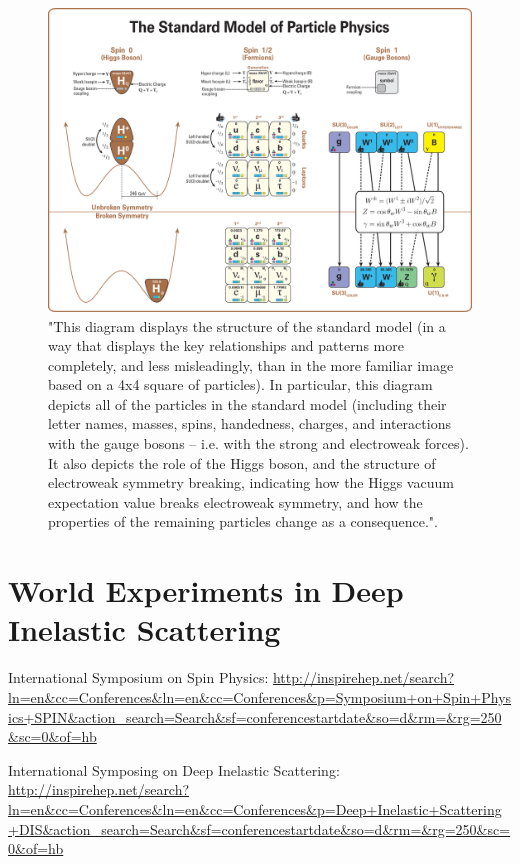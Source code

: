 \begin{figure}[ht]
	\centering
	\includegraphics[width=\linewidth]{figures/standard_model_complete_lowres.png}
	\caption{
		"This diagram displays the structure of the standard model (in a way that
		displays the key relationships and patterns more completely, and less
		misleadingly, than in the more familiar image based on a 4x4 square of
		particles). In particular, this diagram depicts all of the particles in the
		standard model (including their letter names, masses, spins, handedness,
		charges, and interactions with the gauge bosons -- i.e. with the strong and
		electroweak forces). It also depicts the role of the Higgs boson, and the
		structure of electroweak symmetry breaking, indicating how the Higgs vacuum
		expectation value breaks electroweak symmetry, and how the properties of the
		remaining particles change as a consequence."\cite{Boyle2014}.
	}
	\label{fig:standardmodel}
\end{figure}


\clearpage
\section{World Experiments in Deep Inelastic Scattering}

International Symposium on Spin Physics:
\url{http://inspirehep.net/search?ln=en&cc=Conferences&ln=en&cc=Conferences&p=Symposium+on+Spin+Physics+SPIN&action_search=Search&sf=conferencestartdate&so=d&rm=&rg=250&sc=0&of=hb}

International Symposing on Deep Inelastic Scattering:
\url{http://inspirehep.net/search?ln=en&cc=Conferences&ln=en&cc=Conferences&p=Deep+Inelastic+Scattering+DIS&action_search=Search&sf=conferencestartdate&so=d&rm=&rg=250&sc=0&of=hb}


